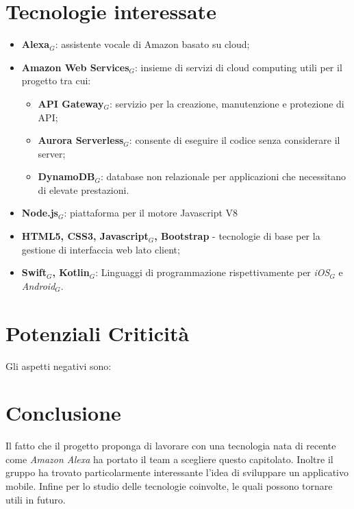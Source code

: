 \section{Tecnologie interessate}
\begin{itemize}
	\item \textbf{Alexa$_{G}$}: assistente vocale di Amazon basato su cloud;
	\item \textbf{Amazon Web Services$_{G}$}: insieme di servizi di cloud computing utili per il progetto tra cui:
	\begin{itemize}
	\item \textbf{API Gateway$_{G}$}: servizio per la creazione, manutenzione e protezione di API;
	\item \textbf{Aurora Serverless$_{G}$}: consente di eseguire il codice senza considerare il server;
	\item \textbf{DynamoDB$_{G}$}: database non relazionale per applicazioni che necessitano di elevate prestazioni.
	\end{itemize}
	\item \textbf{Node.js$_{G}$}: piattaforma per il motore Javascript V8
	\item \textbf{HTML5, CSS3, Javascript$_{G}$, Bootstrap} - tecnologie di base per la gestione di interfaccia web lato client;
	\item \textbf{Swift$_{G}$, Kotlin$_{G}$}: Linguaggi di programmazione rispettivamente per \textit{iOS$_{G}$} e \textit{Android$_{G}$}.
\end{itemize}
\section{Potenziali Criticità}
Gli aspetti negativi sono:
\section{Conclusione}
Il fatto che il progetto proponga di lavorare con una tecnologia nata di recente come \emph{Amazon Alexa} ha portato il team a scegliere questo capitolato. Inoltre il gruppo ha trovato particolarmente interessante l'idea di sviluppare un applicativo mobile. Infine per lo studio delle tecnologie coinvolte, le quali possono tornare utili in futuro.